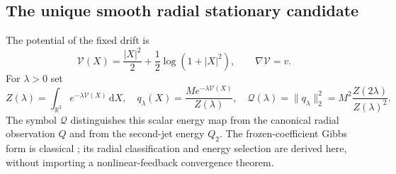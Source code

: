 \documentclass[11pt]{article}
\numberwithin{equation}{section}
\newcommand{\dd}{\,\mathrm d}
\newcommand{\R}{\mathbb R}
\begin{document}
\subsection{The unique smooth radial stationary candidate}

The potential of the fixed drift is
\begin{equation}\label{r13:potential}
 \mathcal V(X)=\frac{|X|^2}{2}+\frac12\log(1+|X|^2),
 \qquad\nabla\mathcal V=v.
\end{equation}
For $\lambda>0$ set
\begin{equation}\label{r13:gibbsdefinitions}
 Z(\lambda)=\int_{\R^3}e^{-\lambda\mathcal V(X)}\dd X,
 \quad q_\lambda(X)=\frac{M e^{-\lambda\mathcal V(X)}}{Z(\lambda)},
 \quad\mathcal Q(\lambda)=\|q_\lambda\|_2^2
                         =M^2\frac{Z(2\lambda)}{Z(\lambda)^2}.
\end{equation}
The symbol $\mathcal Q$ distinguishes this scalar energy map from the
canonical radial observation $Q$ and from the second-jet energy $Q_2$.
The frozen-coefficient Gibbs form is classical \cite{JKO}; its radial
classification and energy selection are derived here, without importing
a nonlinear-feedback convergence theorem.
\end{document}
